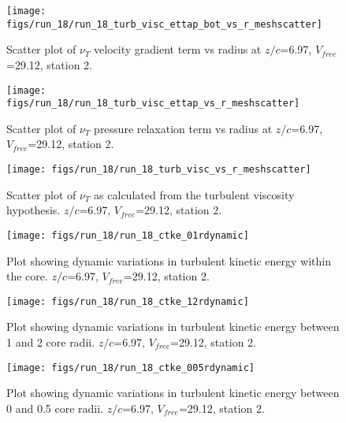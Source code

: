 \begin{figure}[H]
\centering
\texttt{[image: figs/run\_18/run\_18\_turb\_visc\_ettap\_bot\_vs\_r\_meshscatter]}
\caption{Scatter plot of $\nu_T$ velocity gradient term vs radius at $z/c$=6.97, $V_{free}$=29.12, station 2.}
\end{figure}


\begin{figure}[H]
\centering
\texttt{[image: figs/run\_18/run\_18\_turb\_visc\_ettap\_vs\_r\_meshscatter]}
\caption{Scatter plot of $\nu_T$ pressure relaxation term vs radius at $z/c$=6.97, $V_{free}$=29.12, station 2.}
\end{figure}


\begin{figure}[H]
\centering
\texttt{[image: figs/run\_18/run\_18\_turb\_visc\_vs\_r\_meshscatter]}
\caption{Scatter plot of $\nu_T$ as calculated from the turbulent viscosity hypothesis. $z/c$=6.97, $V_{free}$=29.12, station 2.}
\end{figure}


\begin{figure}[H]
\centering
\texttt{[image: figs/run\_18/run\_18\_ctke\_01rdynamic]}
\caption{Plot showing dynamic variations in turbulent kinetic energy within the core. $z/c$=6.97, $V_{free}$=29.12, station 2.}
\end{figure}


\begin{figure}[H]
\centering
\texttt{[image: figs/run\_18/run\_18\_ctke\_12rdynamic]}
\caption{Plot showing dynamic variations in turbulent kinetic energy between 1 and 2 core radii. $z/c$=6.97, $V_{free}$=29.12, station 2.}
\end{figure}


\begin{figure}[H]
\centering
\texttt{[image: figs/run\_18/run\_18\_ctke\_005rdynamic]}
\caption{Plot showing dynamic variations in turbulent kinetic energy between 0 and 0.5 core radii. $z/c$=6.97, $V_{free}$=29.12, station 2.}
\end{figure}



